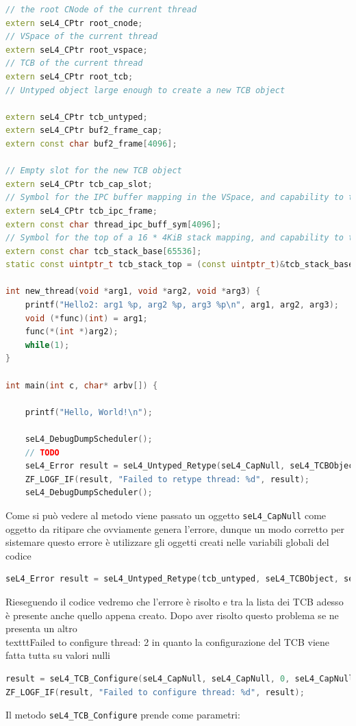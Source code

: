 \begin{lstlisting}[language=C++]
// the root CNode of the current thread
extern seL4_CPtr root_cnode;
// VSpace of the current thread
extern seL4_CPtr root_vspace;
// TCB of the current thread
extern seL4_CPtr root_tcb;
// Untyped object large enough to create a new TCB object

extern seL4_CPtr tcb_untyped;
extern seL4_CPtr buf2_frame_cap;
extern const char buf2_frame[4096];

// Empty slot for the new TCB object
extern seL4_CPtr tcb_cap_slot;
// Symbol for the IPC buffer mapping in the VSpace, and capability to the mapping
extern seL4_CPtr tcb_ipc_frame;
extern const char thread_ipc_buff_sym[4096];
// Symbol for the top of a 16 * 4KiB stack mapping, and capability to the mapping
extern const char tcb_stack_base[65536];
static const uintptr_t tcb_stack_top = (const uintptr_t)&tcb_stack_base + sizeof(tcb_stack_base);

int new_thread(void *arg1, void *arg2, void *arg3) {
    printf("Hello2: arg1 %p, arg2 %p, arg3 %p\n", arg1, arg2, arg3);
    void (*func)(int) = arg1;
    func(*(int *)arg2);
    while(1);
}

int main(int c, char* arbv[]) {

    printf("Hello, World!\n");

    seL4_DebugDumpScheduler();
	// TODO
    seL4_Error result = seL4_Untyped_Retype(seL4_CapNull, seL4_TCBObject, seL4_TCBBits, seL4_CapNull, 0, 0, seL4_CapNull, 1);
    ZF_LOGF_IF(result, "Failed to retype thread: %d", result);
    seL4_DebugDumpScheduler();
\end{lstlisting}
Come si può vedere al metodo viene passato un oggetto \texttt{seL4\_CapNull} come oggetto da ritipare che ovviamente genera l'errore, dunque un modo corretto per sistemare questo errore è utilizzare gli oggetti creati nelle variabili globali del codice
\begin{lstlisting}[language=C++]
seL4_Error result = seL4_Untyped_Retype(tcb_untyped, seL4_TCBObject, seL4_TCBBits, root_cnode, 0, 0, tcb_cap_slot, 1);
\end{lstlisting}
Rieseguendo il codice vedremo che l'errore è risolto e tra la lista dei TCB adesso è presente anche quello appena creato. Dopo aver risolto questo problema se ne presenta un altro \\texttt{Failed to configure thread: 2} in quanto la configurazione del TCB viene fatta tutta su valori nulli
\begin{lstlisting}[language=C++]
result = seL4_TCB_Configure(seL4_CapNull, seL4_CapNull, 0, seL4_CapNull, 0, 0, (seL4_Word) NULL, seL4_CapNull);
ZF_LOGF_IF(result, "Failed to configure thread: %d", result);
\end{lstlisting}
Il metodo \texttt{seL4\_TCB\_Configure} prende come parametri:

